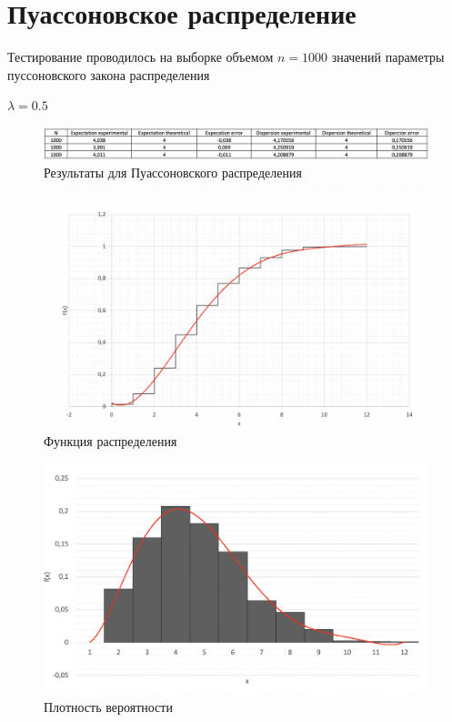 \documentclass{article}
\begin{document}
	\section{Пуассоновское распределение}
		Тестирование проводилось на выборке объемом $n = 1000$ значений параметры пуссоновского закона распределения
		\begin{center}
			$\lambda = 0.5$\\
		\end{center}
		\begin{center}
			\begin{figure}[!htb]
				\includegraphics[scale = 0.46]{poisson/3.png}
				\caption{Результаты для Пуассоновского распределения}
			\end{figure}
		\end{center}
		
		\begin{figure}[!htb]
		    \includegraphics[scale = 0.33]{poisson/2.png}
    		\caption{Функция распределения}
		\end{figure}
		 	 	
		\begin{figure}[!htb]
			\includegraphics[scale = 0.38]{poisson/1.png}
			\caption{Плотность вероятности}
   		\end{figure}
   	\newpage
   	
\end{document}
